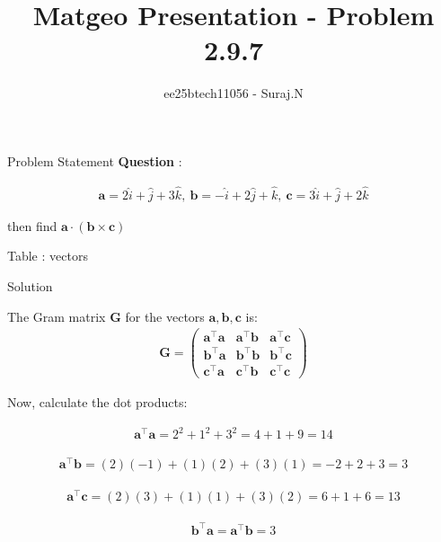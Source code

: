 \documentclass{beamer}
\title{Matgeo Presentation - Problem 2.9.7}
\author{ee25btech11056 - Suraj.N}
\numberwithin{equation}{section}
\theoremstyle{remark}
\newcommand{\myvec}[1]{\ensuremath{\begin{pmatrix}#1\end{pmatrix}}}
\let\vec\mathbf
\begin{document}
\begin{frame}
  \titlepage
\end{frame}

\begin{frame}{Problem Statement}
\textbf{Question} :  

\begin{align*}
\vec{a}=2\hat{i}+\hat{j}+3\hat{k},\ \vec{b}=-\hat{i}+2\hat{j}+\hat{k},\ \vec{c}=3\hat{i}+\hat{j}+2\hat{k}
\end{align*}

\begin{center}
then find \(\vec{a}\cdot(\vec{b}\times\vec{c})\)
\end{center}

\begin{table}[h!]
  \centering
  
  \caption*{Table : vectors}
  \label{2.9.7}
\end{table}

\end{frame}

\begin{frame}{Solution}

The Gram matrix \( \vec{G} \) for the vectors \( \vec{a}, \vec{b}, \vec{c} \) is:
\begin{align}
\vec{G} = \myvec{
\vec{a}^\top \vec{a} & \vec{a}^\top \vec{b} & \vec{a}^\top \vec{c} \\
\vec{b}^\top \vec{a} & \vec{b}^\top \vec{b} & \vec{b}^\top \vec{c} \\
\vec{c}^\top \vec{a} & \vec{c}^\top \vec{b} & \vec{c}^\top \vec{c}
}
\end{align}

Now, calculate the dot products:

\begin{align}
\vec{a}^\top \vec{a} = 2^2 + 1^2 + 3^2 = 4 + 1 + 9 = 14
\end{align}

\begin{align}
\vec{a}^\top \vec{b} = (2)(-1) + (1)(2) + (3)(1) = -2 + 2 + 3 = 3
\end{align}

\begin{align}
\vec{a}^\top \vec{c} = (2)(3) + (1)(1) + (3)(2) = 6 + 1 + 6 = 13
\end{align}

\begin{align}
\vec{b}^\top \vec{a} = \vec{a}^\top \vec{b} = 3
\end{align}

\end{frame}
\end{document}
